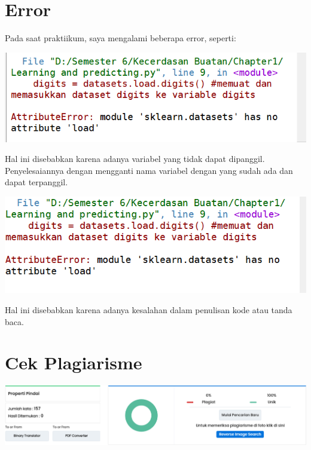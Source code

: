 \documentclass{homework}
\begin{document}
\section{Error}
Pada saat praktiikum, saya mengalami beberapa error, seperti:
\begin{center}
    \includegraphics[width=.8\textwidth]{Pict/error1.PNG}
\end{center}
Hal ini disebabkan karena adanya variabel yang tidak dapat dipanggil. Penyelesaiannya dengan mengganti nama variabel dengan yang sudah ada dan dapat terpanggil.
\begin{center}
    \includegraphics[width=.8\textwidth]{Pict/error2.PNG}
\end{center}
Hal ini disebabkan karena adanya kesalahan dalam penulisan kode atau tanda baca. 

\section{Cek Plagiarisme}
\begin{center}
    \includegraphics[width=.8\textwidth]{Pict/cek.PNG}
\end{center}
\end{document}
